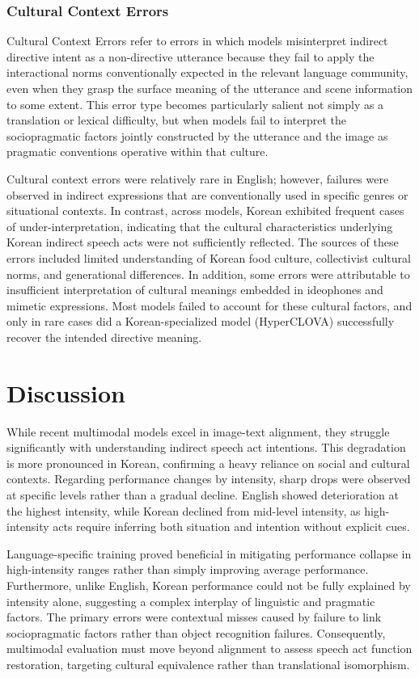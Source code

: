 \documentclass[11pt]{article}
\begin{document}
\subsubsection{Cultural Context Errors}
Cultural Context Errors refer to errors in which models misinterpret indirect directive intent as a non-directive utterance because they fail to apply the interactional norms conventionally expected in the relevant language community, even when they grasp the surface meaning of the utterance and scene information to some extent. This error type becomes particularly salient not simply as a translation or lexical difficulty, but when models fail to interpret the sociopragmatic factors jointly constructed by the utterance and the image as pragmatic conventions operative within that culture.

Cultural context errors were relatively rare in English; however, failures were observed in indirect expressions that are conventionally used in specific genres or situational contexts. In contrast, across models, Korean exhibited frequent cases of under-interpretation, indicating that the cultural characteristics underlying Korean indirect speech acts were not sufficiently reflected. The sources of these errors included limited understanding of Korean food culture, collectivist cultural norms, and generational differences. In addition, some errors were attributable to insufficient interpretation of cultural meanings embedded in ideophones and mimetic expressions. Most models failed to account for these cultural factors, and only in rare cases did a Korean-specialized model (HyperCLOVA) successfully recover the intended directive meaning.


\section{Discussion}
 While recent multimodal models excel in image-text alignment, they struggle significantly with understanding indirect speech act intentions. This degradation is more pronounced in Korean, confirming a heavy reliance on social and cultural contexts. Regarding performance changes by intensity, sharp drops were observed at specific levels rather than a gradual decline. English showed deterioration at the highest intensity, while Korean declined from mid-level intensity, as high-intensity acts require inferring both situation and intention without explicit cues.
 
Language-specific training proved beneficial in mitigating performance collapse in high-intensity ranges rather than simply improving average performance. Furthermore, unlike English, Korean performance could not be fully explained by intensity alone, suggesting a complex interplay of linguistic and pragmatic factors. The primary errors were contextual misses caused by failure to link sociopragmatic factors rather than object recognition failures. Consequently, multimodal evaluation must move beyond alignment to assess speech act function restoration, targeting cultural equivalence rather than translational isomorphism.
\end{document}
